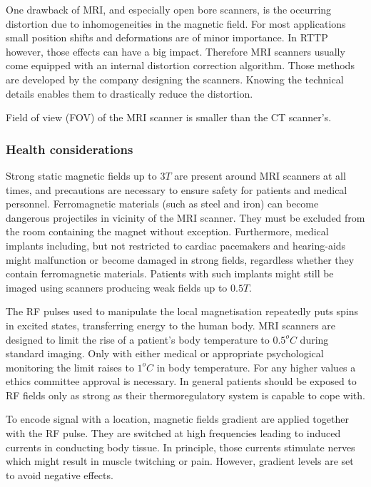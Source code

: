 One drawback of MRI, and especially open bore scanners, is the occurring distortion due to inhomogeneities in the magnetic field.
For most applications small position shifts and deformations are of minor importance.
In RTTP however, those effects can have a big impact.
Therefore MRI scanners usually come equipped with an internal distortion correction algorithm.
Those methods are developed by the company designing the scanners. Knowing the technical details enables them to drastically reduce the distortion.

Field of view (FOV) of the MRI scanner is smaller than the CT scanner's.


\subsubsection{Health considerations}

Strong static magnetic fields up to $3T$ are present around MRI scanners at all times, and precautions are necessary to ensure safety for patients and medical personnel.
Ferromagnetic materials (such as steel and iron) can become dangerous projectiles in vicinity of the MRI scanner. They must be excluded from the room containing the magnet without exception.
Furthermore, medical implants including, but not restricted to cardiac pacemakers and hearing-aids might malfunction or become damaged in strong fields, regardless whether they contain ferromagnetic materials.
Patients with such implants might still be imaged using scanners producing weak fields up to $0.5T$.

The RF pulses used to manipulate the local magnetisation repeatedly puts spins in excited states, transferring energy to the human body. MRI scanners are designed to limit the rise of a patient's body temperature to $0.5^oC$ during standard imaging. Only with either medical or appropriate psychological monitoring the limit raises to $1^oC$ in body temperature. For any higher values a ethics committee approval is necessary.
In general patients should be exposed to RF fields only as strong as their thermoregulatory system is capable to cope with.

To encode signal with a location, magnetic fields gradient are applied together with the RF pulse.
They are switched at high frequencies leading to induced currents in conducting body tissue.
In principle, those currents stimulate nerves which might result in muscle twitching or pain.
However, gradient levels are set to avoid negative effects.

